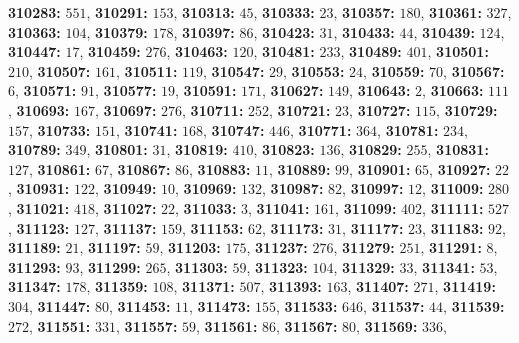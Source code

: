 \textsf{\bfseries 310283:} $551$, \textsf{\bfseries 310291:} $153$, \textsf{\bfseries 310313:} $45$, \textsf{\bfseries 310333:} $23$, \textsf{\bfseries 310357:} $180$, \textsf{\bfseries 310361:} $327$, \textsf{\bfseries 310363:} $104$, \textsf{\bfseries 310379:} $178$, \textsf{\bfseries 310397:} $86$, \textsf{\bfseries 310423:} $31$, \textsf{\bfseries 310433:} $44$, \textsf{\bfseries 310439:} $124$, \textsf{\bfseries 310447:} $17$, \textsf{\bfseries 310459:} $276$, \textsf{\bfseries 310463:} $120$, \textsf{\bfseries 310481:} $233$, \textsf{\bfseries 310489:} $401$, \textsf{\bfseries 310501:} $210$, \textsf{\bfseries 310507:} $161$, \textsf{\bfseries 310511:} $119$, \textsf{\bfseries 310547:} $29$, \textsf{\bfseries 310553:} $24$, \textsf{\bfseries 310559:} $70$, \textsf{\bfseries 310567:} $6$, \textsf{\bfseries 310571:} $91$, \textsf{\bfseries 310577:} $19$, \textsf{\bfseries 310591:} $171$, \textsf{\bfseries 310627:} $149$, \textsf{\bfseries 310643:} $2$, \textsf{\bfseries 310663:} $111$, \textsf{\bfseries 310693:} $167$, \textsf{\bfseries 310697:} $276$, \textsf{\bfseries 310711:} $252$, \textsf{\bfseries 310721:} $23$, \textsf{\bfseries 310727:} $115$, \textsf{\bfseries 310729:} $157$, \textsf{\bfseries 310733:} $151$, \textsf{\bfseries 310741:} $168$, \textsf{\bfseries 310747:} $446$, \textsf{\bfseries 310771:} $364$, \textsf{\bfseries 310781:} $234$, \textsf{\bfseries 310789:} $349$, \textsf{\bfseries 310801:} $31$, \textsf{\bfseries 310819:} $410$, \textsf{\bfseries 310823:} $136$, \textsf{\bfseries 310829:} $255$, \textsf{\bfseries 310831:} $127$, \textsf{\bfseries 310861:} $67$, \textsf{\bfseries 310867:} $86$, \textsf{\bfseries 310883:} $11$, \textsf{\bfseries 310889:} $99$, \textsf{\bfseries 310901:} $65$, \textsf{\bfseries 310927:} $22$, \textsf{\bfseries 310931:} $122$, \textsf{\bfseries 310949:} $10$, \textsf{\bfseries 310969:} $132$, \textsf{\bfseries 310987:} $82$, \textsf{\bfseries 310997:} $12$, \textsf{\bfseries 311009:} $280$, \textsf{\bfseries 311021:} $418$, \textsf{\bfseries 311027:} $22$, \textsf{\bfseries 311033:} $3$, \textsf{\bfseries 311041:} $161$, \textsf{\bfseries 311099:} $402$, \textsf{\bfseries 311111:} $527$, \textsf{\bfseries 311123:} $127$, \textsf{\bfseries 311137:} $159$, \textsf{\bfseries 311153:} $62$, \textsf{\bfseries 311173:} $31$, \textsf{\bfseries 311177:} $23$, \textsf{\bfseries 311183:} $92$, \textsf{\bfseries 311189:} $21$, \textsf{\bfseries 311197:} $59$, \textsf{\bfseries 311203:} $175$, \textsf{\bfseries 311237:} $276$, \textsf{\bfseries 311279:} $251$, \textsf{\bfseries 311291:} $8$, \textsf{\bfseries 311293:} $93$, \textsf{\bfseries 311299:} $265$, \textsf{\bfseries 311303:} $59$, \textsf{\bfseries 311323:} $104$, \textsf{\bfseries 311329:} $33$, \textsf{\bfseries 311341:} $53$, \textsf{\bfseries 311347:} $178$, \textsf{\bfseries 311359:} $108$, \textsf{\bfseries 311371:} $507$, \textsf{\bfseries 311393:} $163$, \textsf{\bfseries 311407:} $271$, \textsf{\bfseries 311419:} $304$, \textsf{\bfseries 311447:} $80$, \textsf{\bfseries 311453:} $11$, \textsf{\bfseries 311473:} $155$, \textsf{\bfseries 311533:} $646$, \textsf{\bfseries 311537:} $44$, \textsf{\bfseries 311539:} $272$, \textsf{\bfseries 311551:} $331$, \textsf{\bfseries 311557:} $59$, \textsf{\bfseries 311561:} $86$, \textsf{\bfseries 311567:} $80$, \textsf{\bfseries 311569:} $336$, 
